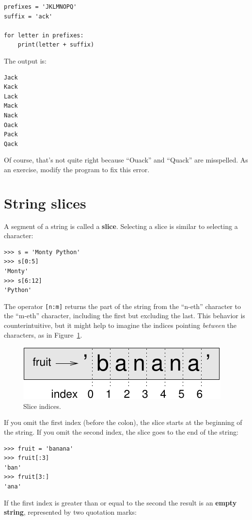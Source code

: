 \documentclass[10pt]{book}
\begin{document}
\begin{verbatim}
prefixes = 'JKLMNOPQ'
suffix = 'ack'

for letter in prefixes:
    print(letter + suffix)
\end{verbatim}
%
The output is:

\begin{verbatim}
Jack
Kack
Lack
Mack
Nack
Oack
Pack
Qack
\end{verbatim}
%
Of course, that's not quite right because ``Ouack'' and ``Quack'' are
misspelled.  As an exercise, modify the program to fix this error.



\section{String slices}
\label{slice}
  
 

A segment of a string is called a {\bf slice}.  Selecting a slice is
similar to selecting a character:

\begin{verbatim}
>>> s = 'Monty Python'
>>> s[0:5]
'Monty'
>>> s[6:12]
'Python'
\end{verbatim}
%
The operator {\tt [n:m]} returns the part of the string from the 
``n-eth'' character to the ``m-eth'' character, including the first but
excluding the last.  This behavior is counterintuitive, but it might
help to imagine the indices pointing {\em between} the
characters, as in Figure~\ref{fig.banana}.

\begin{figure}
\centerline
{\includegraphics[scale=0.8]{figs/banana.pdf}}
\caption{Slice indices.}
\label{fig.banana}
\end{figure}

If you omit the first index (before the colon), the slice starts at
the beginning of the string.  If you omit the second index, the slice
goes to the end of the string:

\begin{verbatim}
>>> fruit = 'banana'
>>> fruit[:3]
'ban'
>>> fruit[3:]
'ana'
\end{verbatim}
%
If the first index is greater than or equal to the second the result
is an {\bf empty string}, represented by two quotation marks:
\end{document}
